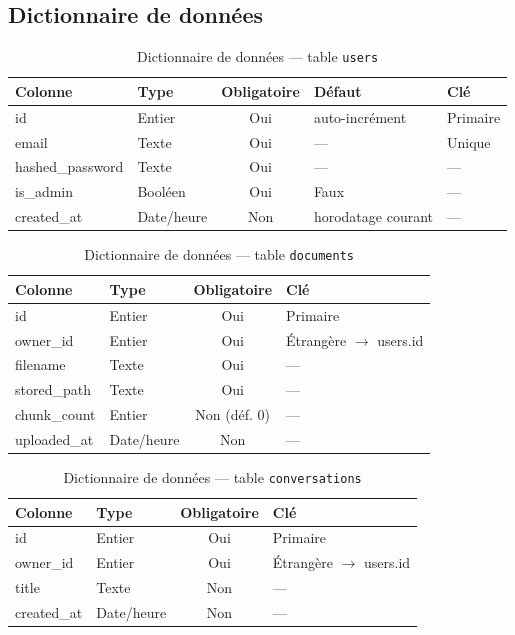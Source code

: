 \documentclass[12pt,a4paper]{report}
\begin{document}
\subsection{Dictionnaire de données}

\begin{table}[h]
\centering
\caption{Dictionnaire de données — table \texttt{users}}
\begin{tabular}{|l|l|c|l|l|}
\hline
\textbf{Colonne} & \textbf{Type} & \textbf{Obligatoire} & \textbf{Défaut} & \textbf{Clé} \\
\hline
id & Entier & Oui & auto-incrément & Primaire \\
email & Texte & Oui & — & Unique \\
hashed\_password & Texte & Oui & — & — \\
is\_admin & Booléen & Oui & Faux & — \\
created\_at & Date/heure & Non & horodatage courant & — \\
\hline
\end{tabular}
\end{table}

\begin{table}[h]
\centering
\caption{Dictionnaire de données — table \texttt{documents}}
\begin{tabular}{|l|l|c|l|}
\hline
\textbf{Colonne} & \textbf{Type} & \textbf{Obligatoire} & \textbf{Clé} \\
\hline
id & Entier & Oui & Primaire \\
owner\_id & Entier & Oui & Étrangère $\rightarrow$ users.id \\
filename & Texte & Oui & — \\
stored\_path & Texte & Oui & — \\
chunk\_count & Entier & Non (déf. 0) & — \\
uploaded\_at & Date/heure & Non & — \\
\hline
\end{tabular}
\end{table}

\begin{table}[h]
\centering
\caption{Dictionnaire de données — table \texttt{conversations}}
\begin{tabular}{|l|l|c|l|}
\hline
\textbf{Colonne} & \textbf{Type} & \textbf{Obligatoire} & \textbf{Clé} \\
\hline
id & Entier & Oui & Primaire \\
owner\_id & Entier & Oui & Étrangère $\rightarrow$ users.id \\
title & Texte & Non & — \\
created\_at & Date/heure & Non & — \\
\hline
\end{tabular}
\end{table}
\end{document}
